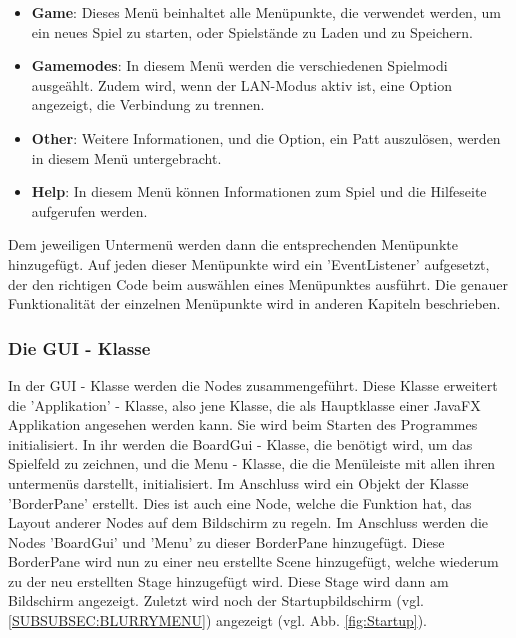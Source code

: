 \documentclass[12pt,a4paper]{article}
\begin{document}
{\begin{itemize}
	\item{\textbf{Game}: Dieses Menü beinhaltet alle Menüpunkte, die verwendet werden, um ein neues Spiel zu starten, oder Spielstände zu Laden und zu Speichern.}
	
	\item{\textbf{Gamemodes}: In diesem Menü werden die verschiedenen Spielmodi ausgeählt. Zudem wird, wenn der LAN-Modus aktiv ist, eine Option angezeigt, die Verbindung zu trennen.  
	}
	\item{\textbf{Other}: Weitere Informationen, und die Option, ein Patt auszulösen, werden in diesem Menü untergebracht.}
	\item{\textbf{Help}: In diesem Menü können Informationen zum Spiel und die Hilfeseite aufgerufen werden. }
\end{itemize}
Dem jeweiligen Untermenü werden dann die entsprechenden Menüpunkte hinzugefügt. Auf jeden dieser Menüpunkte wird ein 'EventListener' aufgesetzt, der den richtigen Code beim auswählen eines Menüpunktes ausführt. Die genauer Funktionalität der einzelnen Menüpunkte wird in anderen Kapiteln beschrieben. 

\subsubsection{Die GUI - Klasse}
In der GUI - Klasse werden die Nodes zusammengeführt. Diese Klasse erweitert die 'Applikation' - Klasse, also jene Klasse, die als Hauptklasse einer JavaFX Applikation angesehen werden kann. Sie wird beim Starten des Programmes initialisiert. In ihr werden die BoardGui - Klasse, die benötigt wird, um das Spielfeld zu zeichnen, und die Menu - Klasse, die die Menüleiste mit allen ihren untermenüs darstellt, initialisiert. Im Anschluss wird ein Objekt der Klasse 'BorderPane' erstellt. Dies ist auch eine Node, welche die Funktion hat, das Layout anderer Nodes auf dem Bildschirm zu regeln. Im Anschluss werden die Nodes 'BoardGui' und 'Menu' zu dieser BorderPane hinzugefügt. Diese BorderPane wird nun zu einer neu erstellte Scene hinzugefügt, welche wiederum zu der neu erstellten Stage hinzugefügt wird. Diese Stage wird dann am Bildschirm angezeigt. 
Zuletzt wird noch der Startupbildschirm (vgl. \ref{SUBSUBSEC:BLURRYMENU}) angezeigt (vgl. Abb. \ref{fig:Startup}).

}
\end{document}
